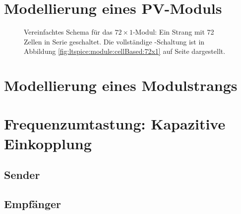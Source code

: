 \clearpage
\section{Modellierung eines PV-Moduls}
\label{sec:simu:model:module}


\begin{figure}[h!tb]
    \centering
    
    \caption{%
        Vereinfachtes      Schema      f\"ur      das      $72      \times
        1$-Modul: Ein     Strang    mit     72     Zellen     in     Serie
        geschaltet. Die  vollst\"andige  -Schaltung  ist  in
        Abbildung   \ref{fig:ltspice:module:cellBased:72x1}    auf   Seite
        \pageref{fig:ltspice:module:cellBased:72x1} dargestellt.%
    }
    \label{fig:circuit:72x1:simplified}
\end{figure}


\clearpage
\section{Modellierung eines Modulstrangs}
\label{sec:simu:model:module:string}

\section{Frequenzumtastung: Kapazitive Einkopplung}
\label{sec:simu:fsk:capacitive}

\subsection{Sender}
\label{sec:simu:fsk:capacitive:transmitter}

\subsection{Empf\"anger}
\label{sec:simu:fsk:capacitive:receiver}

